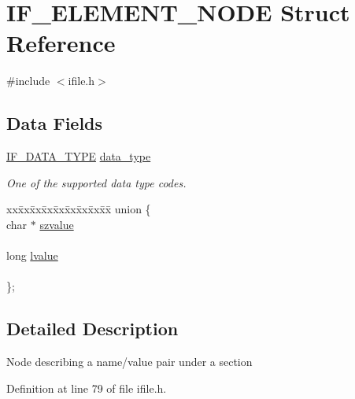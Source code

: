 \hypertarget{struct_i_f___e_l_e_m_e_n_t___n_o_d_e}{\section{I\-F\-\_\-\-E\-L\-E\-M\-E\-N\-T\-\_\-\-N\-O\-D\-E Struct Reference}
\label{struct_i_f___e_l_e_m_e_n_t___n_o_d_e}
}


{\ttfamily \#include $<$ifile.\-h$>$}

\subsection*{Data Fields}
\begin{DoxyCompactItemize}
\item 
\hyperlink{ifile_8h_a6d7d0c4867b985eb267b77615087d37a}{I\-F\-\_\-\-D\-A\-T\-A\-\_\-\-T\-Y\-P\-E} \hyperlink{struct_i_f___e_l_e_m_e_n_t___n_o_d_e_ae27efc82f81963f04c22dcfcc70c8766}{data\-\_\-type}
\begin{DoxyCompactList}\small\item\em One of the supported data type codes. \end{DoxyCompactList}\item 
\begin{tabbing}
xx\=xx\=xx\=xx\=xx\=xx\=xx\=xx\=xx\=\kill
union \{\\
\>char $\ast$ \hyperlink{struct_i_f___e_l_e_m_e_n_t___n_o_d_e_aaaa4cb8698d025a0d88dbf1393392320}{szvalue}\\
\>\\
\>long \hyperlink{struct_i_f___e_l_e_m_e_n_t___n_o_d_e_ad27f45c6331d8b6ac603e0cae235fb61}{lvalue}\\
\>\\
\}; \\

\end{tabbing}\end{DoxyCompactItemize}


\subsection{Detailed Description}
Node describing a name/value pair under a section 

Definition at line 79 of file ifile.\-h.



